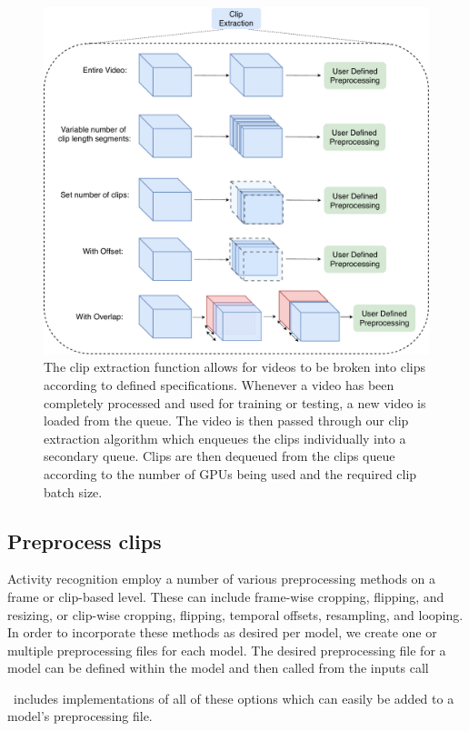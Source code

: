 \documentclass{llncs}
\begin{document}
\begin{figure}[b!]
\centering
\includegraphics[width=0.8\columnwidth]{images/extract_clips.pdf}
\caption{The clip extraction function allows for videos to be broken into clips according to defined specifications.
Whenever a video has been completely processed and used for training or testing, a new video is loaded from the queue.
The video is then passed through our clip extraction algorithm which enqueues the clips individually into a secondary queue.
Clips are then dequeued from the clips queue according to the number of GPUs being used and the required clip batch size.}
\label{fig:extract_clips}
\end{figure}


\subsection{Preprocess clips}
\label{sec:preprocessclips}
Activity recognition employ a number of various preprocessing methods on a frame or clip-based level.
These can include frame-wise cropping, flipping, and resizing, or clip-wise cropping, flipping, temporal offsets, resampling, and looping.
In order to incorporate these methods as desired per model, we create one or multiple preprocessing files for each model.
The desired preprocessing file for a model can be defined within the model and then called from the inputs call 

\acro~includes implementations of all of these options which can easily be added to a model's preprocessing file.
\end{document}

